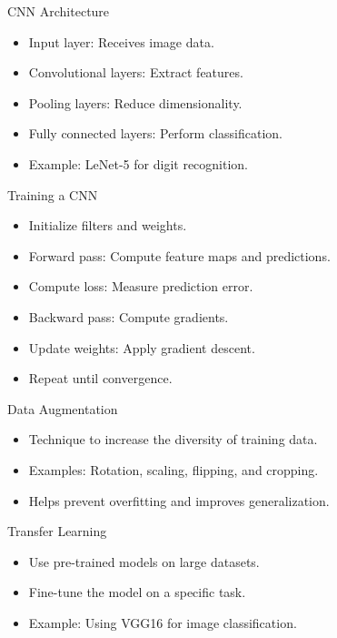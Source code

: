 \documentclass{beamer}
\begin{document}
\begin{frame}{CNN Architecture}
    \begin{itemize}
        \item Input layer: Receives image data.
        \item Convolutional layers: Extract features.
        \item Pooling layers: Reduce dimensionality.
        \item Fully connected layers: Perform classification.
        \item Example: LeNet-5 for digit recognition.
    \end{itemize}
\end{frame}

\begin{frame}{Training a CNN}
    \begin{itemize}
        \item Initialize filters and weights.
        \item Forward pass: Compute feature maps and predictions.
        \item Compute loss: Measure prediction error.
        \item Backward pass: Compute gradients.
        \item Update weights: Apply gradient descent.
        \item Repeat until convergence.
    \end{itemize}
\end{frame}

\begin{frame}{Data Augmentation}
    \begin{itemize}
        \item Technique to increase the diversity of training data.
        \item Examples: Rotation, scaling, flipping, and cropping.
        \item Helps prevent overfitting and improves generalization.
    \end{itemize}
\end{frame}

\begin{frame}{Transfer Learning}
    \begin{itemize}
        \item Use pre-trained models on large datasets.
        \item Fine-tune the model on a specific task.
        \item Example: Using VGG16 for image classification.
    \end{itemize}
\end{frame}
\end{document}
